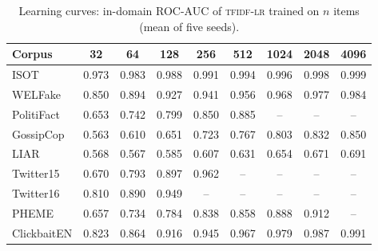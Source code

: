 \begin{table}[h]
\centering
\caption{Learning curves: in-domain ROC-AUC of \textsc{tfidf-lr} trained on $n$ items (mean of five seeds).}\label{tab:supp-lc}
\small
\begin{tabular}{@{}lcccccccc@{}}
\toprule
Corpus & 32 & 64 & 128 & 256 & 512 & 1024 & 2048 & 4096 \\
\midrule
ISOT & 0.973 & 0.983 & 0.988 & 0.991 & 0.994 & 0.996 & 0.998 & 0.999 \\
WELFake & 0.850 & 0.894 & 0.927 & 0.941 & 0.956 & 0.968 & 0.977 & 0.984 \\
PolitiFact & 0.653 & 0.742 & 0.799 & 0.850 & 0.885 & -- & -- & -- \\
GossipCop & 0.563 & 0.610 & 0.651 & 0.723 & 0.767 & 0.803 & 0.832 & 0.850 \\
LIAR & 0.568 & 0.567 & 0.585 & 0.607 & 0.631 & 0.654 & 0.671 & 0.691 \\
Twitter15 & 0.670 & 0.793 & 0.897 & 0.962 & -- & -- & -- & -- \\
Twitter16 & 0.810 & 0.890 & 0.949 & -- & -- & -- & -- & -- \\
PHEME & 0.657 & 0.734 & 0.784 & 0.838 & 0.858 & 0.888 & 0.912 & -- \\
ClickbaitEN & 0.823 & 0.864 & 0.916 & 0.945 & 0.967 & 0.979 & 0.987 & 0.991 \\
\bottomrule
\end{tabular}
\end{table}
